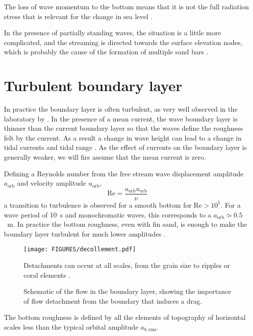The loss of wave momentum to the bottom means that it is not the full radiation stress that is relevant for the change in sea level 
\citep{Longuet-Higgins2005,Ardhuin2006b}. 

In the presence of partially standing waves, the situation is a little more complicated, and the streaming is directed towards the surface elevation nodes, 
which is probably the cause of the formation of multiple sand bars  \citep{Heathershaw1982}.

\section{Turbulent boundary layer}
In practice the boundary layer is often turbulent, as very well observed in the laboratory by \cite{Jensen&al.1989}.
In the presence of a mean current, the wave boundary layer is thinner than the current boundary layer so that the waves define the roughness felt by the current. As a result
a change in wave height can lead to a change in tidal currents and tidal range  \citep{Wolf&Prandle1999}. 
As the effect of currents on the boundary layer is generally weaker, 
we will firs assume that the mean current is zero. 

Defining a Reynolds number from the free stream wave displacement amplitude $a_{\mathrm{orb}}$ and 
velocity amplitude $u_{\mathrm{orb}}$, 
\begin{equation}
 \mathrm{Re} = \frac{a_{\mathrm{orb}} u_{\mathrm{orb}}}{\nu}
\end{equation}
a transition to turbulence is observed for a smooth bottom for $\mathrm{Re} > 10^5$. For a wave period
of 10~s and monochromatic waves, this corresponds to a $a_{\mathrm{orb}} \simeq 0.5$~m. 
In practice the bottom roughness, even with fin sand, is enough to make the boundary layer turbulent 
for much lower amplitudes \citep{Jonsson1967}.
\begin{figure}
\centerline{\texttt{[image: FIGURES/decollement.pdf]}}
  \caption{Schematic of the flow in the boundary layer, showing the 
  importance of flow detachment from the boundary that induces a drag.}
  {Detachments can occur at all scales, from the grain size to ripples or coral elements \citep[e.g.][]{Monismith&al.2015}.}
   \label{fig_decollement}
\end{figure}
The bottom roughness is defined 
by all the elements of topography of horizontal scales less than the typical 
orbital amplitude $a_{b,{\mathrm{rms}}}$.

